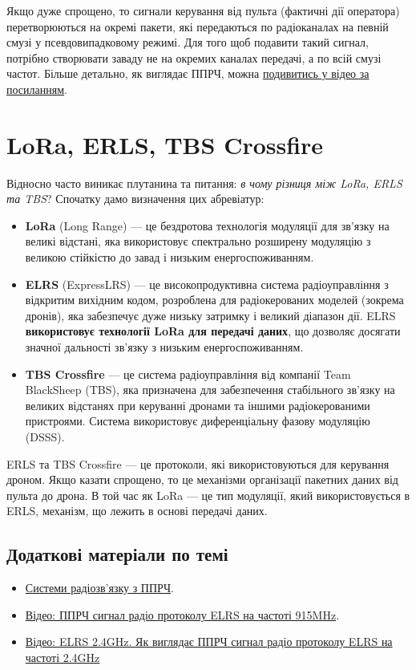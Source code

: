 \documentclass{article}
\begin{document}
Якщо дуже спрощено, то сигнали керування від пульта (фактичні дії оператора) перетворюються на окремі пакети, які передаються по радіоканалах на певній смузі у псевдовипадковому режимі. Для того щоб подавити такий сигнал, потрібно створювати заваду не на окремих каналах передачі, а по всій смузі частот. Більше детально, як виглядає ППРЧ, можна \href{https://www.youtube.com/watch?v=REyNJcrZHII}{подивитись у відео за посиланням}.

\section{LoRa, ERLS, TBS Crossfire}
Відносно часто виникає плутанина та питання: \textit{в чому різниця між LoRa, ERLS та TBS}? Спочатку дамо визначення цих абревіатур:
\begin{itemize}[noitemsep, topsep=8pt]
\item \textbf{LoRa} (Long Range) --- це бездротова технологія модуляції для зв'язку на великі відстані, яка використовує спектрально розширену модуляцію з великою стійкістю до завад і низьким енергоспоживанням. 
\item \textbf{ELRS} (ExpressLRS) — це високопродуктивна система радіоуправління з відкритим вихідним кодом, розроблена для радіокерованих моделей (зокрема дронів), яка забезпечує дуже низьку затримку і великий діапазон дії. ELRS \textbf{використовує технології LoRa для передачі даних}, що дозволяє досягати значної дальності зв'язку з низьким енергоспоживанням.
\item \textbf{TBS Crossfire} --- це система радіоуправління від компанії Team BlackSheep (TBS), яка призначена для забезпечення стабільного зв'язку на великих відстанях при керуванні дронами та іншими радіокерованими пристроями. Система використовує диференціальну фазову модуляцію (DSSS).
\end{itemize}

ERLS та TBS Crossfire --- це протоколи, які використовуються для керування дроном. Якщо казати спрощено, то це механізми організації пакетних даних від пульта до дрона. В той час як LoRa --- це тип модуляції, який використовується в ERLS, механізм, що лежить в основі передачі даних.

\subsection{Додаткові матеріали по темі}
\begin{itemize}[noitemsep, topsep=8pt]
\item \href{https://sprotyvg7.com.ua/lesson/sistemi-radiozvyazku-z-pprch}{Системи радіозв’язку з ППРЧ}.
\item \href{https://www.youtube.com/watch?v=1y8IdV4leCM}{Відео: ППРЧ сигнал радіо протоколу ELRS на частоті 915MHz}.
\item \href{https://www.youtube.com/watch?v=REyNJcrZHII}{Відео: ELRS 2.4GHz. Як виглядає ППРЧ сигнал радіо протоколу ELRS на частоті 2.4GHz}
\end{itemize}
\end{document}
